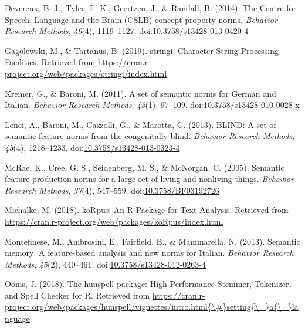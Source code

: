 \documentclass[man]{apa6}
\begin{document}
\leavevmode\hypertarget{ref-Devereux2014}{}%
Devereux, B. J., Tyler, L. K., Geertzen, J., \& Randall, B. (2014). The Centre for Speech, Language and the Brain (CSLB) concept property norms. \emph{Behavior Research Methods}, \emph{46}(4), 1119--1127. doi:\href{https://doi.org/10.3758/s13428-013-0420-4}{10.3758/s13428-013-0420-4}

\leavevmode\hypertarget{ref-Gagolewski2019}{}%
Gagolewski, M., \& Tartanus, B. (2019). stringi: Character String Processing Facilities. Retrieved from \url{https://cran.r-project.org/web/packages/stringi/index.html}

\leavevmode\hypertarget{ref-Kremer2011a}{}%
Kremer, G., \& Baroni, M. (2011). A set of semantic norms for German and Italian. \emph{Behavior Research Methods}, \emph{43}(1), 97--109. doi:\href{https://doi.org/10.3758/s13428-010-0028-x}{10.3758/s13428-010-0028-x}

\leavevmode\hypertarget{ref-Lenci2013}{}%
Lenci, A., Baroni, M., Cazzolli, G., \& Marotta, G. (2013). BLIND: A set of semantic feature norms from the congenitally blind. \emph{Behavior Research Methods}, \emph{45}(4), 1218--1233. doi:\href{https://doi.org/10.3758/s13428-013-0323-4}{10.3758/s13428-013-0323-4}

\leavevmode\hypertarget{ref-McRae2005}{}%
McRae, K., Cree, G. S., Seidenberg, M. S., \& McNorgan, C. (2005). Semantic feature production norms for a large set of living and nonliving things. \emph{Behavior Research Methods}, \emph{37}(4), 547--559. doi:\href{https://doi.org/10.3758/BF03192726}{10.3758/BF03192726}

\leavevmode\hypertarget{ref-Michalke2018}{}%
Michalke, M. (2018). koRpus: An R Package for Text Analysis. Retrieved from \url{https://cran.r-project.org/web/packages/koRpus/index.html}

\leavevmode\hypertarget{ref-Montefinese2013}{}%
Montefinese, M., Ambrosini, E., Fairfield, B., \& Mammarella, N. (2013). Semantic memory: A feature-based analysis and new norms for Italian. \emph{Behavior Research Methods}, \emph{45}(2), 440--461. doi:\href{https://doi.org/10.3758/s13428-012-0263-4}{10.3758/s13428-012-0263-4}

\leavevmode\hypertarget{ref-Ooms2018}{}%
Ooms, J. (2018). The hunspell package: High-Performance Stemmer, Tokenizer, and Spell Checker for R. Retrieved from \href{https://cran.r-project.org/web/packages/hunspell/vignettes/intro.html\%7B/\#\%7Dsetting\%7B/_\%7Da\%7B/_\%7Dlanguage}{https://cran.r-project.org/web/packages/hunspell/vignettes/intro.html\{\textbackslash{}\#\}setting\{\textbackslash{}\_\}a\{\textbackslash{}\_\}language}
\end{document}
